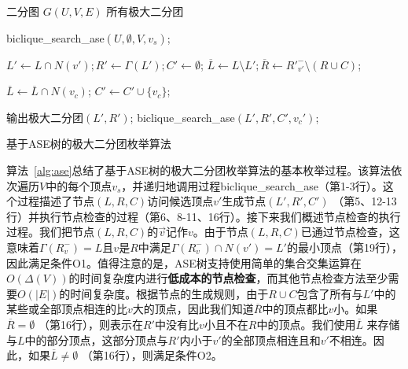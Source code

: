 \begin{algorithm}[H]
  \begin{algorithmic}[1]
      \normalsize
      \REQUIRE 二分图 $G(U,V,E)$
      \ENSURE 所有极大二分团
      
      \renewcommand{\algorithmicdo}{\textbf{do}}
        \STATE \textsf{biclique\_search\_ase}$(U,\emptyset,V,v_s)$;
      \ENDFOR

      \renewcommand{\algorithmicwhile}{\textbf{procedure}}
      \renewcommand{\algorithmicdo}{\textbf{:}}
      \renewcommand{\algorithmicdo}{\textbf{do}}
      \STATE $L' \leftarrow L \cap N(v'); R' \leftarrow \Gamma(L'); C' \leftarrow \emptyset$;
      \STATE $\overline{L}\leftarrow L \setminus L'; \overline{R}\leftarrow {R'}_{v'}^- \setminus (R \cup C)$;

              \STATE $\overline{L} \leftarrow \overline{L} \cap N(v_c)$; 
            \ENDIF
            \STATE $C' \leftarrow C' \cup \{v_c\}$;
          \ENDIF
        \ENDFOR

          \STATE 输出极大二分团$(L', R')$;
              \STATE \textsf{biclique\_search\_ase}$(L', R', C', v_c')$;
            \ENDIF
          \ENDFOR
        \ENDIF
      \ENDWHILE

  \end{algorithmic}
  \caption{基于ASE树的极大二分团枚举算法}
  \label{alg:ase}
\end{algorithm}



算法~\ref{alg:ase}总结了基于ASE树的极大二分团枚举算法的基本枚举过程。该算法依次遍历$V$中的每个顶点$v_s$，并递归地调用过程\textsf{biclique\_search\_ase}（第1-3行）。这个过程描述了节点$(L,R,C)$访问候选顶点$v'$生成节点$(L',R',C')$ （第5、12-13行）并执行节点检查的过程（第6、8-11、16行）。接下来我们概述节点检查的执行过程。我们把节点$(L,R,C)$的$\vec{v}$记作$v$。由于节点$(L,R,C)$已通过节点检查，这意味着$\Gamma(R_v^-) = L$且$v$是$R$中满足$\Gamma(R_v^-) \cap N(v') = L'$的最小顶点（第19行），因此满足条件O1。值得注意的是，ASE树支持使用简单的集合交集运算在$O(\Delta(V))$的时间复杂度内进行\textbf{低成本的节点检查}，而其他节点检查方法至少需要$O(|E|)$的时间复杂度。根据节点的生成规则，由于$R \cup C$包含了所有与$L'$中的某些或全部顶点相连的比$v$大的顶点，因此我们知道$\overline{R}$中的顶点都比$v$小。如果$\overline{R} = \emptyset$ （第16行），则表示在$R'$中没有比$v$小且不在$R$中的顶点。我们使用$\overline{L}$ 来存储与$L$中的部分顶点，这部分顶点与$R'$内小于$v'$的全部顶点相连且和$v'$不相连。因此，如果$\overline{L} \neq \emptyset$ （第16行），则满足条件O2。

